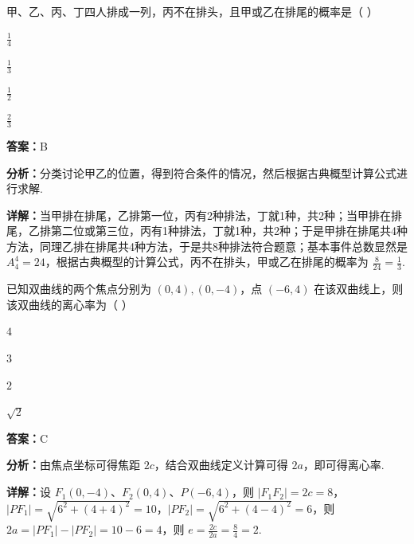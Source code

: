 \begin{question}[points=5]
甲、乙、丙、丁四人排成一列，丙不在排头，且甲或乙在排尾的概率是（ ）
\begin{choices}
  \item $\frac{1}{4}$
  \item $\frac{1}{3}$
  \item $\frac{1}{2}$
  \item $\frac{2}{3}$
\end{choices}
\begin{solution}
\textbf{答案：}B

\textbf{分析：}分类讨论甲乙的位置，得到符合条件的情况，然后根据古典概型计算公式进行求解.

\textbf{详解：}当甲排在排尾，乙排第一位，丙有2种排法，丁就1种，共2种；当甲排在排尾，乙排第二位或第三位，丙有1种排法，丁就1种，共2种；于是甲排在排尾共4种方法，同理乙排在排尾共4种方法，于是共8种排法符合题意；基本事件总数显然是 $A_4^4 = 24$，根据古典概型的计算公式，丙不在排头，甲或乙在排尾的概率为 $\frac{8}{24} = \frac{1}{3}$.
\end{solution}
\end{question}

\begin{question}[points=5]
已知双曲线的两个焦点分别为 $(0,4), (0,-4)$，点 $(-6,4)$ 在该双曲线上，则该双曲线的离心率为（ ）
\begin{choices}
  \item $4$
  \item $3$
  \item $2$
  \item $\sqrt{2}$
\end{choices}
\begin{solution}
\textbf{答案：}C

\textbf{分析：}由焦点坐标可得焦距 $2c$，结合双曲线定义计算可得 $2a$，即可得离心率.

\textbf{详解：}设 $F_1(0,-4)$、$F_2(0,4)$、$P(-6,4)$，则 $|F_1F_2| = 2c = 8$，$|PF_1| = \sqrt{6^2 + (4+4)^2} = 10$，$|PF_2| = \sqrt{6^2 + (4-4)^2} = 6$，则 $2a = |PF_1| - |PF_2| = 10 - 6 = 4$，则 $e = \frac{2c}{2a} = \frac{8}{4} = 2$.
\end{solution}
\end{question}

